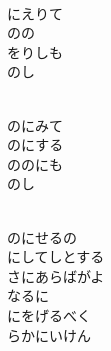 \documentclass[10pt,b5j]{tarticle} %
\begin{document}
\vspace{1.5em} %
\newcommand{\linespace}{0.5em} %
\newcommand{\blocksize}{0.5\hsize} %
\newcommand{\itemmargin}{3em} %
\begin{enumerate} %
    \setlength{\itemindent}{\itemmargin} %
    \begin{minipage}[c]{\blocksize}
    
        \vspace{\linespace}
        \item~\\
        にえりて\\
        のの\\
        をりしも\\
        のし
        
    \end{minipage}
    \begin{minipage}[c]{\blocksize}
        
        \vspace{\linespace}
        \item~\\
        のにみて\\
        のにする\\
        ののにも\\
        のし
        
    \end{minipage}
    \begin{minipage}[c]{\blocksize}
        
        \vspace{\linespace}
        \item~\\
        のにせるの\\
        にしてしとする\\
        さにあらばがよ\\
        なるに\\
        にをげるべく\\
        らかにいけん
        

\end{minipage}
\end{enumerate}
\end{document}
